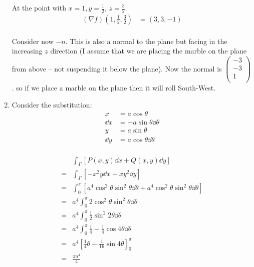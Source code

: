 \documentclass[10pt,\jkfside,a4paper]{article}
\begin{document}
\begin{enumerate}
At the point with $x = 1, y = \frac{1}{2}$, $z = \frac{3}{2}$.
\begin{equation}
\begin{split}
(\nabla f)\left(1, \frac{1}{2}, \frac{3}{2}\right) &= \left(3, 3, -1\right) \\
\end{split}
\end{equation}

Consider now $-n$. This is also a normal to the plane but facing in the increasing 
$z$ direction (I assume that we are placing the marble on the plane from above -- not 
suspending it below the plane). Now the normal is $\begin{pmatrix} -3 \\ -3 \\ 1 \\ \end{pmatrix}$. 
so if we place a marble on the plane then it will roll South-West.

\item 
Consider the substitution:
\begin{equation}
\begin{split}
x &= a\cos\theta \\
\dd{x} &= -a\sin\theta \dd{\theta} \\
y &= a\sin\theta \\
\dd{y} &= a\cos\theta \dd{\theta} \\
\end{split}
\end{equation}

\begin{equation}
\begin{split}
 & \int_\Gamma [P(x, y)\dd{x} + Q(x, y)\dd{y}] \\
=& \int_\Gamma [-x^2y\dd{x} + xy^2\dd{y}] \\
=& \int^{\pi}_{0}[a^4\cos^2\theta\sin^2\theta\dd{\theta} + a^4\cos^2\theta\sin^2\theta\dd{\theta}] \\
=& a^4\int^{\pi}_{0}2\cos^2\theta\sin^2\theta\dd{\theta} \\
=& a^4\int^{\pi}_{0}\frac{1}{2}\sin^{2}2\theta\dd{\theta} \\
=& a^4\int^{\pi}_{0}\frac{1}{4} - \frac{1}{4}\cos4\theta\dd{\theta} \\
=& a^4\left[\frac{1}{4}\theta - \frac{1}{16}\sin4\theta\right]^\pi_0 \\
=& \frac{\pi a^4}{4} \\
\end{split}
\end{equation}


\end{enumerate}
\end{document}
